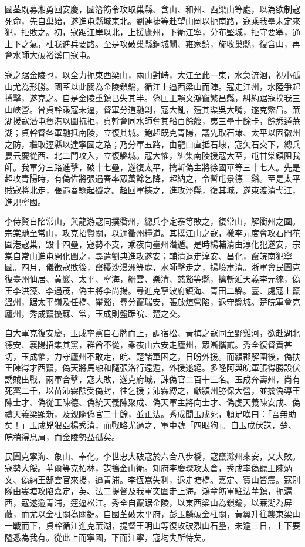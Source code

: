 \begin{pinyinscope}
國荃既募湘勇回安慶，國籓飭令攻取巢縣、含山、和州、西梁山等處，以為欲制寇死命，先自巢始，遂進屯縣城東北。劉連捷等赴望山岡以扼南路，寇乘我壘未定來犯，拒敗之。初，寇踞江岸以北，上援廬州，下衛江寧，分布堅城，拒守要塞，通上下之氣，杜我進兵要路。至是攻破巢縣銅城閘、雍家鎮，旋收巢縣，復含山，再會水師大破裕溪口寇屯。

寇之踞金陵也，以全力扼東西梁山，兩山對峙，大江至此一束，水急流洄，視小孤山尤為形勝。國荃以此關為金陵鎖鑰，循江上逼西梁山而陣。寇走江州，水陸爭起搏擊，遂克之。自是金陵重鎮已失其半。偽匡王賴文鴻竄繁昌縣，糾約踞寇撲我三山峽營。曾貞幹乘寇未逼，督軍分道馳剿，寇大亂，殪其渠吳大嘴，遂克繁昌。蕪湖援寇潛屯魯港以圖抗拒，貞幹會同水師奪其船百餘艘，夷三壘十餘卡，餘悉遁蕪湖；貞幹督各軍馳抵南陵，立復其城。鮑超既克青陽，議先取石埭、太平以固徽州之防，繼取涇縣以達寧國之路；乃分軍五路，由龍口直抵石埭，寇矢石交下，總兵婁云慶從西、北二門攻入，立復縣城。寇大懼，糾集南陵援寇大至，屯甘棠鎮阻我師。我軍分三路進擊，破十七壘，遂復太平，擒斬偽主將徐國華等三十七人。先是超攻青陽時，有偽佐將張遇春率眾萬餘乞降，超納之，令暫屯景德三谿。至是太平賊寇將北走，張遇春驟起殲之。超回軍挾之，進攻涇縣，復其城，遂東渡清弋江，進規寧國。

李侍賢自陷常山，與龍游寇同撲衢州，總兵李定泰等敗之，復常山，解衢州之圍。宗棠馳至常山，攻克招賢關，以通衢州糧道。其撲江山之寇，檄李元度會攻石門花園港寇巢，毀十四壘，寇勢不支，乘夜向臺州潛遁。是時楊輔清由淳化犯遂安，宗棠自常山進屯開化圖之，尋遣劉典進攻遂安；輔清退走淳安、昌化，竄皖南犯寧國。四月，儀徵寇敗後，竄擾沙漫洲等處，水師擊走之，揚境肅清。浙軍會民團克復臺州仙居、黃巖、太平、寧海，縉雲、樂清、慈谿等縣，擒斬延天義李元徠，偽王李洪藻、李遇茂，偽主將李尚揚。尋進克寧波府鎮海、青田二縣。臺、處寇上竄溫州，踞太平嶺及任橋、瞿谿，尋分竄瑞安，張啟煊營陷，退守縣城。楚皖軍會克廬州，秀成竄擾蘇、常，玉成則盤踞皖、楚之交。

自大軍克復安慶，玉成率黨自石牌而上，調宿松、黃梅之寇同至野雞河，欲赴湖北德安、襄陽招集其黨，群酋不從，乘夜由六安走廬州，眾漸攜貳。秀全復督責甚切，玉成懼，力守廬州不敢走，皖、楚諸軍困之，日盼外援。而潁郡解圍後，偽扶王陳得才西竄，偽天將馬融和隨張洛行遠遁，外援遂絕。多隆阿與皖軍張得勝設伏誘賊出戰，兩軍合擊，寇大敗，遂克府城，誅偽官二百十三名。玉成奔壽州，尚有死黨二千，以苗沛霖陰受偽封，往乞援；沛霖縛之，獻潁州勝保大營，並擒偽導王陳士才、偽從王陳德、偽統天義陳聚成、偽天軍主將向士才、偽虔天義陳安成、偽禱天義梁顯新，及親隨偽官二十餘，並正法。秀成聞玉成死，頓足嘆曰：「吾無助矣！」玉成兇狠亞楊秀清，而戰略尤過之，軍中號「四眼狗」。自玉成伏誅，楚、皖稍得息肩，而金陵勢益孤矣。

民團克寧海、象山、奉化。李世忠大破寇於六合八步橋，寇竄滁州來安，又大敗。寇勢大餒。華爾等克柘林，謀搗金山衛。知府李慶琛攻太倉，秀成率偽聽王陳炳文、偽納王郜雲官來援，逼青浦。李恆嵩失利，退走塘橋。嘉定、寶山皆震。寇別隊由婁塘攻陷嘉定，英、法二提督及我軍突圍走上海。鴻章飭軍駐法華鎮，扼滬西，寇遂逾青浦，逕逼松江。秀全自竄踞金陵，以東西梁山為鎖鑰，以蕪湖為屏蔽，而尤以金柱關為關鍵。自國荃破太平府，彭玉麟破金柱關，黃翼升往襲東梁山一戰而下，貞幹循江進克蕪湖，提督王明山等復攻破烈山石壘，未逾三日，上下要隘悉為我有。從此上而寧國，下而江寧，寇均失所恃矣。


\end{pinyinscope}
